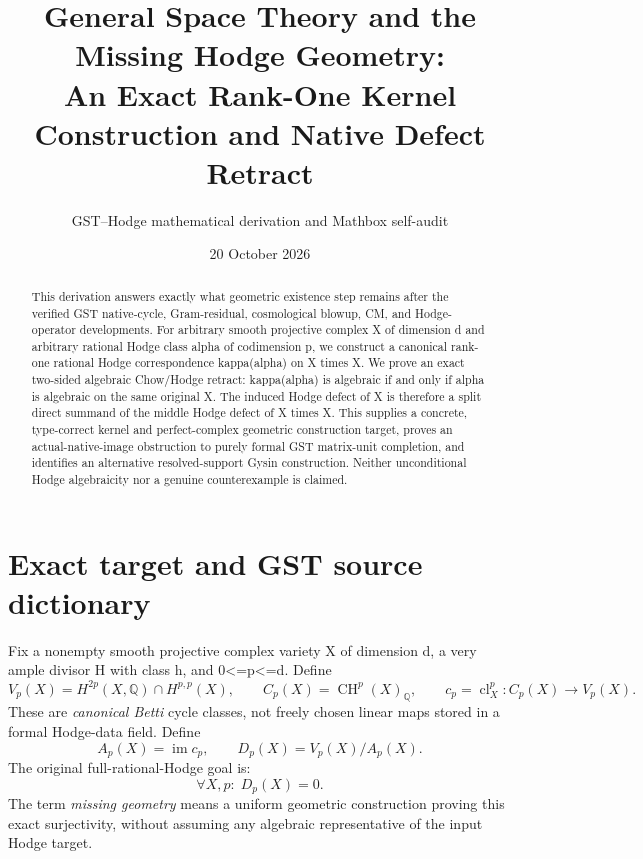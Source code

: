 \documentclass[11pt,a4paper]{article}
\title{General Space Theory and the Missing Hodge Geometry:\\
An Exact Rank-One Kernel Construction and Native Defect Retract}
\author{GST--Hodge mathematical derivation and Mathbox self-audit}
\date{20 October 2026}
\newcommand{\Q}{\mathbb Q}
\newcommand{\CH}{\operatorname{CH}}
\newcommand{\cl}{\operatorname{cl}}
\newcommand{\im}{\operatorname{im}}
\begin{document}
\maketitle
\begin{abstract}
This derivation answers exactly what geometric existence step remains
after the verified GST native-cycle, Gram-residual, cosmological
blowup, CM, and Hodge-operator developments.  For arbitrary
smooth projective complex X of dimension d and arbitrary rational
Hodge class alpha of codimension p, we construct a canonical rank-one
rational Hodge correspondence kappa(alpha) on X times X.
We prove an exact two-sided algebraic Chow/Hodge retract:
kappa(alpha) is algebraic if and only if alpha is algebraic on the
same original X.  The induced Hodge defect of X is therefore a
split direct summand of the middle Hodge defect of X times X.
This supplies a concrete, type-correct kernel and perfect-complex
geometric construction target, proves an actual-native-image
obstruction to purely formal GST matrix-unit completion, and
identifies an alternative resolved-support Gysin construction.
Neither unconditional Hodge algebraicity nor a genuine
counterexample is claimed.
\end{abstract}

\section{Exact target and GST source dictionary}
Fix a nonempty smooth projective complex variety X of dimension d,
a very ample divisor H with class h, and 0<=p<=d.  Define
\[
 V_p(X)=H^{2p}(X,\Q)\cap H^{p,p}(X),\qquad
 C_p(X)=\CH^p(X)_\Q,\qquad
 c_p=\cl_X^p:C_p(X)\longrightarrow V_p(X).
\]
These are \emph{canonical Betti} cycle classes, not freely chosen
linear maps stored in a formal Hodge-data field.  Define
\[
 A_p(X)=\im c_p,\qquad D_p(X)=V_p(X)/A_p(X).
 \tag{1.1}\label{eq:defect}
\]
The original full-rational-Hodge goal is:
\[
 \boxed{\forall X,p:\;D_p(X)=0.}\tag{1.2}\label{eq:target}
\]
The term \emph{missing geometry} means a uniform geometric
construction proving this exact surjectivity, without assuming
any algebraic representative of the input Hodge target.
\end{document}
